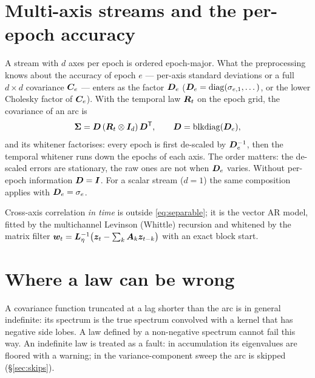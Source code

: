 \section{Multi-axis streams and the per-epoch accuracy}\label{sec:multiaxis}

A stream with $d$ axes per epoch is ordered epoch-major. What the preprocessing knows about the
accuracy of epoch $e$ --- per-axis standard deviations or a full $d\times d$ covariance
$\bm{C}_e$ --- enters as the factor $\bm{D}_e$ ($\bm{D}_e=\operatorname{diag}(\sigma_{e,1},\dots)$, or the lower
Cholesky factor of $\bm{C}_e$). With the temporal law $\bm{R}_t$ on the epoch grid, the covariance of
an arc is
\begin{equation}\label{eq:separable}
\bm{\Sigma}=\bm{D}\,(\bm{R}_t\otimes\bm{I}_d)\,\bm{D}^{\mathsf T},\qquad \bm{D}=\operatorname{blkdiag}(\bm{D}_e),
\end{equation}
and its whitener factorises: every epoch is first de-scaled by $\bm{D}_e^{-1}$, then the temporal
whitener runs down the epochs of each axis. The order matters: the de-scaled errors are
stationary, the raw ones are not when $\bm{D}_e$ varies. Without per-epoch information
$\bm{D}=\bm{I}$. For a scalar stream ($d=1$) the same composition applies with $\bm{D}_e=\sigma_e$.

Cross-axis correlation \emph{in time} is outside \eqref{eq:separable}; it is the vector AR model,
fitted by the multichannel Levinson (Whittle) recursion and whitened by the matrix filter
$\bm{w}_t=\bm{L}_\eta^{-1}\bigl(\bm{z}_t-\sum_k\bm{A}_k\bm{z}_{t-k}\bigr)$ with an exact block start.

\section{Where a law can be wrong}\label{sec:nonpd}

A covariance function truncated at a lag shorter than the arc is in general indefinite: its
spectrum is the true spectrum convolved with a kernel that has negative side lobes. A law defined
by a non-negative spectrum cannot fail this way. An indefinite law is treated as a fault: in
accumulation its eigenvalues are floored with a warning; in the variance-component sweep the arc
is skipped (\S\ref{sec:skips}).
